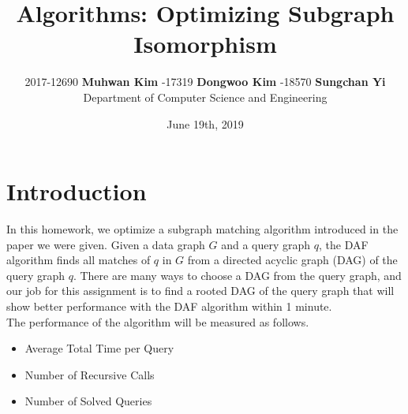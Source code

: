 \documentclass[12pt]{article}
\begin{document}
 
\title{\sffamily Algorithms: Optimizing Subgraph Isomorphism}
\author{\sffamily
	{\normalsize 2017-12690 \textbf{Muhwan Kim} -17319 \textbf{Dongwoo Kim} -18570 \textbf{Sungchan Yi}}\\
	\sffamily \normalsize Department of Computer Science and Engineering}
\date{\sffamily \normalsize June 19th, 2019}

\maketitle
\tableofcontents

\section{Introduction}
In this homework, we optimize a subgraph matching algorithm introduced in the paper we were given. Given a data graph $G$ and a query graph $q$, the DAF algorithm finds all matches of $q$ in $G$ from a directed acyclic graph (DAG) of the query graph $q$. There are many ways to choose a DAG from the query graph, and our job for this assignment is to find a rooted DAG of the query graph that will show better performance with the DAF algorithm within 1 minute.\\
The performance of the algorithm will be measured as follows.
\begin{itemize}
	\item Average Total Time per Query
	\item Number of Recursive Calls
	\item Number of Solved Queries
\end{itemize}
\end{document}

